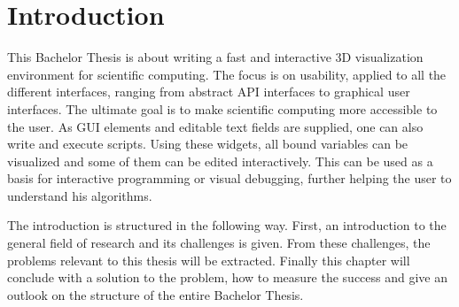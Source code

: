 \section{Introduction}
This Bachelor Thesis is about writing a fast and interactive 3D visualization environment for scientific computing. 
The focus is on usability, applied to all the different interfaces, ranging from abstract API interfaces to graphical user interfaces. 
The ultimate goal is to make scientific computing more accessible to the user.
As \ac{GUI} elements and editable text fields are supplied, one can also write and execute scripts.
Using these widgets, all bound variables can be visualized and some of them can be edited interactively. 
This can be used as a basis for interactive programming or visual debugging, further helping the user to understand his algorithms.

The introduction is structured in the following way.
First, an introduction to the general field of research and its challenges is given. 
From these challenges, the problems relevant to this thesis will be extracted.
Finally this chapter will conclude with a solution to the problem, how to measure the success and give an outlook on the structure of the entire Bachelor Thesis.


